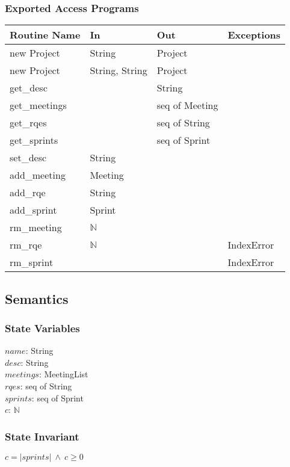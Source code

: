 \documentclass[12pt, titlepage]{article}
\begin{document}
\subsubsection* {Exported Access Programs}
\begin{tabular}{|l|l|l|l|}
    \hline
    \textbf{Routine Name} & \textbf{In} & \textbf{Out} & \textbf{Exceptions} \\
    \hline
    new Project & String & Project & \\
    \hline
    new Project & String, String & Project & \\
    \hline
    get\_desc & & String &\\
    \hline
    get\_meetings & & seq of Meeting &\\
    \hline
    get\_rqes & & seq of String & \\
    \hline
    get\_sprints & & seq of Sprint & \\
    \hline
    set\_desc & String & &\\
    \hline
    add\_meeting & Meeting & & \\
    \hline
    add\_rqe & String & & \\
    \hline
    add\_sprint & Sprint & & \\
    \hline
    rm\_meeting & $\mathbb{N}$ &  &\\
    \hline
    rm\_rqe & $\mathbb{N}$ &  & IndexError\\
    \hline
    rm\_sprint & & & IndexError\\
    \hline
\end{tabular}

\subsection*{Semantics}
\subsubsection*{State Variables}
$name$: String\\
$desc$: String\\
$meetings$: MeetingList\\
$rqes$: seq of String\\
$sprints$: seq of Sprint\\
$c$: $\mathbb{N}$

\subsubsection*{State Invariant}
$c = |sprints|\ \land\ c \geq 0$ 
\end{document}
